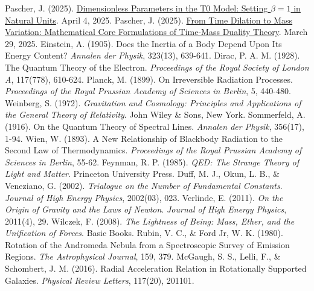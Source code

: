 \documentclass[12pt,a4paper]{article}
\begin{document}
\begin{thebibliography}{99}
		 Pascher, J. (2025). \href{https://github.com/jpascher/T0-Time-Mass-Duality/tree/main/2/pdf/English/Die Konsistenz von alpha = 1 und beta = 1_en.pdf}{Dimensionless Parameters in the T0 Model: Setting \(\beta = 1\) in Natural Units}. April 4, 2025.
		 Pascher, J. (2025). \href{https://github.com/jpascher/T0-Time-Mass-Duality/tree/main/2/pdf/English/Mathematische Formulierungen der Zeit-Masse-Dualitätstheorie mit Lagrange_en.pdf}{From Time Dilation to Mass Variation: Mathematical Core Formulations of Time-Mass Duality Theory}. March 29, 2025.
		 Einstein, A. (1905). Does the Inertia of a Body Depend Upon Its Energy Content? \textit{Annalen der Physik}, 323(13), 639-641.
		 Dirac, P. A. M. (1928). The Quantum Theory of the Electron. \textit{Proceedings of the Royal Society of London A}, 117(778), 610-624.
		 Planck, M. (1899). On Irreversible Radiation Processes. \textit{Proceedings of the Royal Prussian Academy of Sciences in Berlin}, 5, 440-480.
		 Weinberg, S. (1972). \textit{Gravitation and Cosmology: Principles and Applications of the General Theory of Relativity}. John Wiley \& Sons, New York.
		 Sommerfeld, A. (1916). On the Quantum Theory of Spectral Lines. \textit{Annalen der Physik}, 356(17), 1-94.
		 Wien, W. (1893). A New Relationship of Blackbody Radiation to the Second Law of Thermodynamics. \textit{Proceedings of the Royal Prussian Academy of Sciences in Berlin}, 55-62.
		 Feynman, R. P. (1985). \textit{QED: The Strange Theory of Light and Matter}. Princeton University Press.
		 Duff, M. J., Okun, L. B., \& Veneziano, G. (2002). \textit{Trialogue on the Number of Fundamental Constants}. \textit{Journal of High Energy Physics}, 2002(03), 023.
		 Verlinde, E. (2011). \textit{On the Origin of Gravity and the Laws of Newton}. \textit{Journal of High Energy Physics}, 2011(4), 29.
		 Wilczek, F. (2008). \textit{The Lightness of Being: Mass, Ether, and the Unification of Forces}. Basic Books.
		 Rubin, V. C., \& Ford Jr, W. K. (1980). Rotation of the Andromeda Nebula from a Spectroscopic Survey of Emission Regions. \textit{The Astrophysical Journal}, 159, 379.
		 McGaugh, S. S., Lelli, F., \& Schombert, J. M. (2016). Radial Acceleration Relation in Rotationally Supported Galaxies. \textit{Physical Review Letters}, 117(20), 201101.
	\end{thebibliography}
	
\end{document}
